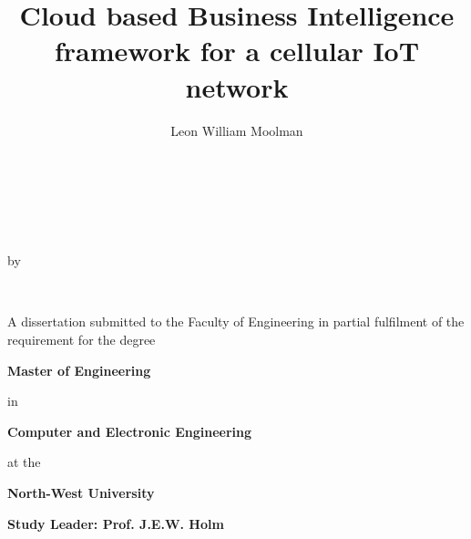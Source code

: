 \documentclass[a4paper,12pt,notitlepage,final]{report}
\title{Cloud based Business Intelligence framework for a cellular IoT network}
\author{Leon William Moolman}
\renewcommand{\date}{\monthname[\month] \the\year}
\begin{document}

\begin{titlepage}
\centering
{
\hspace{1cm} \vspace{1cm} \\
\makeatletter
\begin{Huge} \textbf{\textit{\@title}} \end{Huge} \vspace{1.5cm} \\
\makeatother

\begin{large}
by \vspace{0.6cm}\\
\end{large}

\begin{Large} 
\makeatletter
\textbf{\Large{\@author}}\\ 
\makeatother
\vspace{0.8cm}
\end{Large} 
 \begin{large}
A dissertation submitted to the Faculty of Engineering
% 
% 
in partial fulfilment of the requirement for the degree\\
\vspace{0.6cm}
\end{large}
\begin{Large}
\textbf{Master of Engineering} \\
\end{Large} 
\begin{large}
\vspace{0.6cm}
in \\
\vspace{0.6cm}
\end{large}
\begin{Large}
\textbf{Computer and Electronic Engineering}\\
\vspace{0.6cm}
\end{Large} 
\begin{large}
at the \\
\vspace{0.6cm}
\end{large}
\begin{Large}
\textbf{North-West University}\\
\end{Large} 

\vspace{2cm}
 \textbf{\Large{Study Leader: Prof. J.E.W. Holm}}\\
\vspace{1cm}
\begin{Large}
\textbf{\date}
\end{Large}
}
\pagebreak
\end{titlepage}
\end{document}
